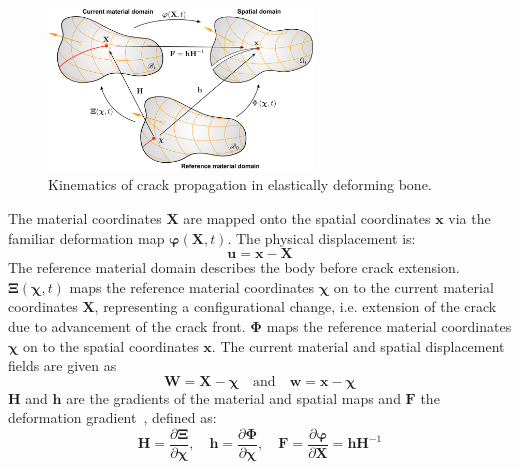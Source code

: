 \documentclass[twocolumn]{svjour3}
\begin{document}
\begin{figure}[th] 
\setlength{\fboxsep}{0pt}%
\setlength{\fboxrule}{0pt}%
\begin{center}
\includegraphics[width=7cm]{Figures/domains5.pdf} 
\end{center}
\caption{Kinematics of crack propagation in elastically deforming bone.}
\label{fig:domains4}
\end{figure}

The material coordinates $\mathbf{X}$ are mapped onto the spatial coordinates $\mathbf{x}$ via the
familiar deformation map $\boldsymbol\varphi(\mathbf{X},t)$. The physical displacement is:
\begin{equation}
\mathbf{u}=\mathbf{x}-\mathbf{X}
\end{equation}
The reference material domain describes the body before crack extension. ${\boldsymbol\Xi}(\boldsymbol\chi,t)$ maps the reference material coordinates $\boldsymbol\chi$ on to the current material coordinates $\mathbf{X}$, representing a configurational change, i.e. extension of the crack due to advancement of the crack front. ${\boldsymbol\Phi}$ maps the reference material coordinates $\boldsymbol\chi$ on to the spatial coordinates $\mathbf{x}$. The current material and spatial displacement fields are given as
\begin{equation}
\mathbf{W} = \mathbf{X} - {\boldsymbol\chi}\quad\textrm{and}\quad
\mathbf{w} = \mathbf{x} - {\boldsymbol\chi}
\end{equation}
$\mathbf{H}$ and $\mathbf{h}$ are the gradients of the material and spatial maps and $\mathbf{F}$ the deformation gradient~\cite{kaczmarczyk2014three}, defined as:
\begin{equation}
\mathbf{H}=\frac{\partial {\boldsymbol\Xi}}{\partial {\boldsymbol\chi}},\quad\mathbf{h}=\frac{\partial {\boldsymbol\Phi}}{\partial {\boldsymbol\chi}},\quad\mathbf{F} = \frac{\partial \boldsymbol\varphi}{\partial \mathbf{X}} = \mathbf{h}\mathbf{H}^{-1}
\end{equation}
\end{document}

